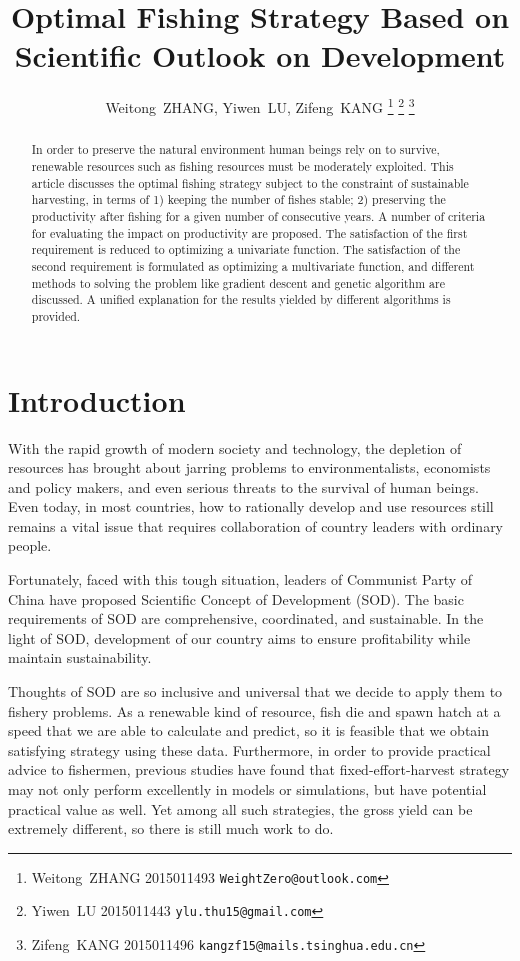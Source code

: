 \documentclass{IEEEtran}
\title{Optimal Fishing Strategy Based on Scientific Outlook on Development}
\author{
    Weitong~ZHANG, Yiwen~LU, Zifeng~KANG
    \thanks{Weitong~ZHANG 2015011493  \texttt{WeightZero@outlook.com}}
    \thanks{Yiwen~LU 2015011443  \texttt{ylu.thu15@gmail.com}}
    \thanks{Zifeng~KANG 2015011496  \texttt{kangzf15@mails.tsinghua.edu.cn}}
}
\begin{document}
\maketitle

\begin{abstract}
In order to preserve the natural environment human beings rely on to survive, renewable resources such as fishing resources must be moderately exploited. This article discusses the optimal fishing strategy subject to the constraint of sustainable harvesting, in terms of 1) keeping the number of fishes stable; 2) preserving the productivity after fishing for a given number of consecutive years. A number of criteria for evaluating the impact on productivity are proposed. The satisfaction of the first requirement is reduced to optimizing a univariate function. The satisfaction of the second requirement is formulated as optimizing a multivariate function, and different methods to solving the problem like gradient descent and genetic algorithm are discussed. A unified explanation for the results yielded by different algorithms is provided.
\end{abstract}

\section{Introduction}

With the rapid growth of modern society and technology, the depletion of resources has brought about jarring problems to environmentalists, economists and policy makers, and even serious threats to the survival of human beings. Even today, in most countries, how to rationally develop and use resources still remains a vital issue that requires collaboration of country leaders with ordinary people.

Fortunately, faced with this tough situation, leaders of Communist Party of China have proposed Scientific Concept of Development (SOD). The basic requirements of SOD are comprehensive, coordinated, and sustainable. In the light of SOD, development of our country aims to ensure profitability while maintain sustainability.

Thoughts of SOD are so inclusive and universal that we decide to apply them to fishery problems. As a renewable kind of resource, fish die and spawn hatch at a speed that we are able to calculate and predict, so it is feasible that we obtain satisfying strategy using these data. Furthermore, in order to provide practical advice to fishermen, previous studies have found that fixed-effort-harvest strategy may not only perform excellently in models or simulations, but have potential practical value as well. Yet among all such strategies, the gross yield can be extremely different, so there is still much work to do. 
\end{document}
